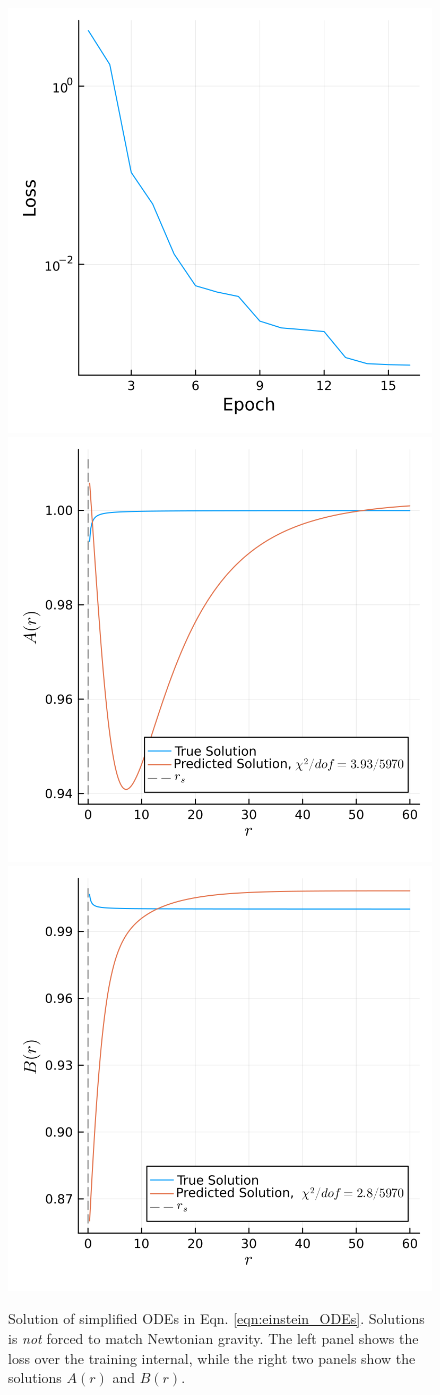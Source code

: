 \documentclass{CUP-JNL-DTM}%
\theoremstyle{definition}
\numberwithin{equation}{section}
\begin{document}
\begin{figure}
    \centering
    \includegraphics[width=0.3\linewidth]{figures/plots_before/loss.png}
    \includegraphics[width=0.3\linewidth]{figures/plots_before/A.png}
    \includegraphics[width=0.3\linewidth]{figures/plots_before/B.png}
    \caption{Solution of simplified ODEs in Eqn. \ref{eqn:einstein_ODEs}. Solutions is \emph{not} forced to match Newtonian gravity. The left panel shows the loss over the training internal, while the right two panels show the solutions $A(r)$ and $B(r)$.}
    \label{fig:before}
\end{figure}
\end{document}
